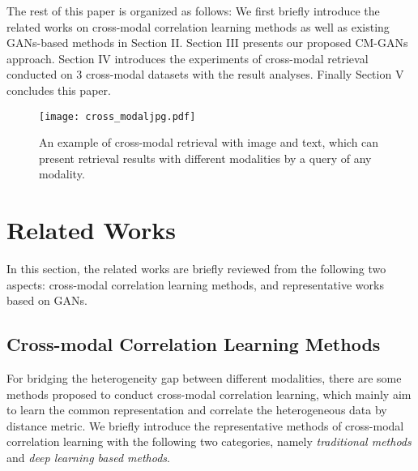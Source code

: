 \documentclass[journal]{IEEEtran}
\begin{document}
The rest of this paper is organized as follows: We first briefly introduce the related works on cross-modal correlation learning methods as well as existing GANs-based methods in Section II. Section III presents our proposed CM-GANs approach. Section IV introduces the experiments of cross-modal retrieval conducted on 3 cross-modal datasets with the result analyses. Finally Section V concludes this paper.

\begin{figure}[!t]
	\centering
	\texttt{[image: cross\_modaljpg.pdf]}
	\caption{An example of cross-modal retrieval with image and text, which can	present retrieval results with different modalities by a query of any modality.}
	\label{fig_cross_media}
\end{figure}

\section{Related Works}

In this section, the related works are briefly reviewed from the following two aspects: cross-modal correlation learning methods, and representative works based on GANs.

\subsection{Cross-modal Correlation Learning Methods}

For bridging the heterogeneity gap between different modalities, there are some methods proposed to conduct cross-modal correlation learning, which mainly aim to learn the common representation and correlate the heterogeneous data by distance metric. We briefly introduce the representative methods of cross-modal correlation learning with the following two categories, namely \textit{traditional methods} and \textit{deep learning based methods}.
\end{document}
